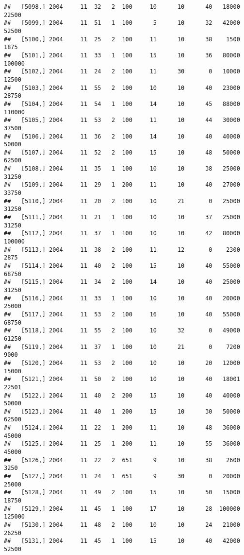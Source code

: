 \documentclass{article}\usepackage[]{graphicx}\usepackage[]{color}
\makeatletter
\newenvironment{kframe}{%
 \def\at@end@of@kframe{}%
 \ifinner\ifhmode%
  \def\at@end@of@kframe{\end{minipage}}%
  \begin{minipage}{\columnwidth}%
 \fi\fi%
 \def\FrameCommand##1{\hskip\@totalleftmargin \hskip-\fboxsep
 \colorbox{shadecolor}{##1}\hskip-\fboxsep
     \hskip-\linewidth \hskip-\@totalleftmargin \hskip\columnwidth}%
 \MakeFramed {\advance\hsize-\width
   \@totalleftmargin\z@ \linewidth\hsize
   \@setminipage}}%
 {\par\unskip\endMakeFramed%
 \at@end@of@kframe}
\newenvironment{knitrout}{}{} %
\makeatother
\begin{document}
\begin{knitrout}
\begin{kframe}
\begin{verbatim}
##   [5098,] 2004     11  32   2  100     10      10      40   18000   22500
##   [5099,] 2004     11  51   1  100      5      10      32   42000   52500
##   [5100,] 2004     11  25   2  100     11      10      38    1500    1875
##   [5101,] 2004     11  33   1  100     15      10      36   80000  100000
##   [5102,] 2004     11  24   2  100     11      30       0   10000   12500
##   [5103,] 2004     11  55   2  100     10      10      40   23000   28750
##   [5104,] 2004     11  54   1  100     14      10      45   88000  110000
##   [5105,] 2004     11  53   2  100     11      10      44   30000   37500
##   [5106,] 2004     11  36   2  100     14      10      40   40000   50000
##   [5107,] 2004     11  52   2  100     15      10      48   50000   62500
##   [5108,] 2004     11  35   1  100     10      10      38   25000   31250
##   [5109,] 2004     11  29   1  200     11      10      40   27000   33750
##   [5110,] 2004     11  20   2  100     10      21       0   25000   31250
##   [5111,] 2004     11  21   1  100     10      10      37   25000   31250
##   [5112,] 2004     11  37   1  100     10      10      42   80000  100000
##   [5113,] 2004     11  38   2  100     11      12       0    2300    2875
##   [5114,] 2004     11  40   2  100     15      10      40   55000   68750
##   [5115,] 2004     11  34   2  100     14      10      40   25000   31250
##   [5116,] 2004     11  33   1  100     10      10      40   20000   25000
##   [5117,] 2004     11  53   2  100     16      10      40   55000   68750
##   [5118,] 2004     11  55   2  100     10      32       0   49000   61250
##   [5119,] 2004     11  37   1  100     10      21       0    7200    9000
##   [5120,] 2004     11  53   2  100     10      10      20   12000   15000
##   [5121,] 2004     11  50   2  100     10      10      40   18001   22501
##   [5122,] 2004     11  40   2  200     15      10      40   40000   50000
##   [5123,] 2004     11  40   1  200     15      10      30   50000   62500
##   [5124,] 2004     11  22   1  200     11      10      48   36000   45000
##   [5125,] 2004     11  25   1  200     11      10      55   36000   45000
##   [5126,] 2004     11  22   2  651      9      10      38    2600    3250
##   [5127,] 2004     11  24   1  651      9      30       0   20000   25000
##   [5128,] 2004     11  49   2  100     15      10      50   15000   18750
##   [5129,] 2004     11  45   1  100     17      10      28  100000  125000
##   [5130,] 2004     11  48   2  100     10      10      24   21000   26250
##   [5131,] 2004     11  45   1  100     15      10      40   42000   52500

\end{verbatim}
\end{kframe}
\end{knitrout}
\end{document}
